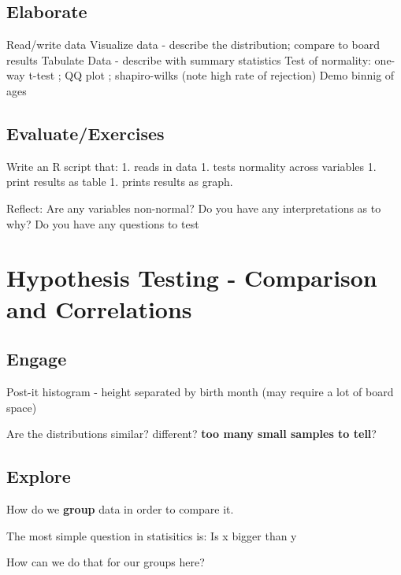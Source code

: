 \documentclass[
]{book}
\begin{document}
\hypertarget{elaborate-2}{%
\section{Elaborate}\label{elaborate-2}}

Read/write data
Visualize data - describe the distribution; compare to board results
Tabulate Data - describe with summary statistics
Test of normality: one-way t-test ; QQ plot ; shapiro-wilks (note high rate of rejection)
Demo binnig of ages

\hypertarget{evaluateexercises-2}{%
\section{Evaluate/Exercises}\label{evaluateexercises-2}}

Write an R script that:
1. reads in data
1. tests normality across variables
1. print results as table
1. prints results as graph.

Reflect: Are any variables non-normal? Do you have any interpretations as to why?
Do you have any questions to test

\hypertarget{hypothesis-testing---comparison-and-correlations}{%
\chapter{Hypothesis Testing - Comparison and Correlations}\label{hypothesis-testing---comparison-and-correlations}}

\hypertarget{engage-3}{%
\section{Engage}\label{engage-3}}

Post-it histogram - height separated by birth month (may require a lot of board space)

Are the distributions similar? different? \textbf{too many small samples to tell}?

\hypertarget{explore-3}{%
\section{Explore}\label{explore-3}}

How do we \textbf{group} data in order to compare it.

The most simple question in statisitics is:
Is x bigger than y

How can we do that for our groups here?
\end{document}
